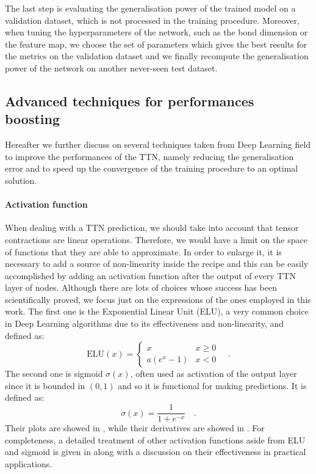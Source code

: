 \documentclass[../main/main.tex]{subfiles}
\begin{document}
The last step is evaluating the generalisation power of the trained model on a validation dataset, which is not processed in the training procedure. Moreover, when tuning the hyperparameters of the network, such as the bond dimension or the feature map, we choose the set of parameters which gives the best results for the metrics on the validation dataset and we finally recompute the generalisation power of the network on another never-seen test dataset.







\subsection{Advanced techniques for performances boosting}
\label{ssec:theory_advanced}
Hereafter we further discuss on several techniques taken from Deep Learning field to improve the performances of the TTN, namely reducing the generalisation error and to speed up the convergence of the training procedure to an optimal solution.


\paragraph{Activation function}
When dealing with a TTN prediction, we should take into account that tensor contractions are linear operations. Therefore, we would have a limit on the space of functions that they are able to approximate. In order to enlarge it, it is necessary to add a source of non-linearity inside the recipe and this can be easily accomplished by adding an activation function after the output of every TTN layer of nodes. Although there are lots of choices whose success has been scientifically proved, we focus just on the expressions of the ones employed in this work. The first one is the Exponential Linear Unit (ELU), a very common choice in Deep Learning algorithms due to its effectiveness and non-linearity, and defined as:
\begin{equation}
    \text{ELU}(x)
    =
    \begin{cases}
        x   &   x \ge 0 \\
        a(e^{x}-1)  &   x < 0
    \end{cases}
    \quad .
\end{equation}
The second one is sigmoid \( \sigma(x) \), often used as activation of the output layer since it is bounded in \( (0,1) \) and so it is functional for making predictions. It is defined as:
\begin{equation}
    \sigma(x)
    =
    \frac{1}{1 + e^{-x}}
    \quad .
\end{equation}
Their plots are showed in , while their derivatives are showed in . For completeness, a detailed treatment of other activation functions aside from ELU and sigmoid is given in \cite{activations} along with a discussion on their effectiveness in practical applications.
\end{document}
